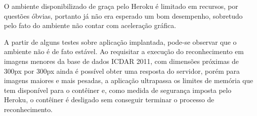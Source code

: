 O ambiente disponibilizado de graça pelo Heroku é limitado em recursos, por questões óbvias, portanto já não era esperado 
um bom desempenho, sobretudo pelo fato do ambiente não contar com aceleração gráfica.

A partir de alguns testes sobre aplicação implantada, pode-se observar que o ambiente não é de fato estável. 
Ao requisitar a execução do reconhecimento em imagens menores da base de dados ICDAR 2011, com dimensões próximas de 300px por 300px 
ainda é possível obter uma resposta do servidor, porém para imagens maiores e mais pesadas, a aplicação ultrapassa os limites de 
memória que tem disponível para o contêiner e, como medida de segurança imposta pelo Heroku, o contêiner é desligado sem conseguir 
terminar o processo de reconhecimento.
